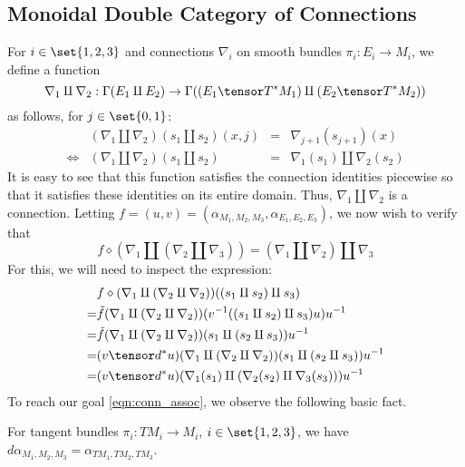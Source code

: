 \documentclass[\PRJWD/Thick_TQFTs_and_Quantum_Information.tex]{subfiles}
\begin{document}
\subsection{Monoidal Double Category of Connections}

For $i \in \set{1, 2, 3}$ and connections $\nabla_i$ on smooth bundles
$\pi_i : E_i \to M_i$, we define a function
\[
  \nabla_1 \amalg \nabla_2
    : \Gamma(E_1 \amalg E_2)
    \to \Gamma((E_1 \tensor T^*M_1) \amalg (E_2 \tensor T^*M_2))
\]
as follows, for $j \in \set{0, 1}$:
\[\begin{array}{crcl}
       & (\nabla_1 \amalg \nabla_2)(s_1 \amalg s_2)(x, j)
       & = & \nabla_{j + 1}(s_{j + 1})(x) \\
  \iff & (\nabla_1 \amalg \nabla_2)(s_1 \amalg s_2)
       & = & \nabla_1(s_1) \amalg \nabla_2(s_2)
\end{array}\]
It is easy to see that this function satisfies the connection identities
piecewise so that it satisfies these identities on its entire domain. Thus,
$\nabla_1 \amalg \nabla_2$ is a connection. Letting
$f = (u, v) = (\alpha_{M_1, M_2, M_3}, \alpha_{E_1, E_2, E_3})$, we now wish to
verify that
\begin{equation}\label{eqn:conn_assoc}
  f \diamond (\nabla_1 \amalg (\nabla_2 \amalg \nabla_3))
    = (\nabla_1 \amalg \nabla_2) \amalg \nabla_3
\end{equation}
For this, we will need to inspect the expression:
\begin{align*}
   & f \diamond (\nabla_1 \amalg (\nabla_2 \amalg \nabla_2))(
        (s_1 \amalg s_2) \amalg s_3
     ) \\
  =& \tilde{f}(\nabla_1 \amalg (\nabla_2 \amalg \nabla_2))(
      v^{-1}((s_1 \amalg s_2) \amalg s_3)u
     )u^{-1} \\
  =& \tilde{f}(\nabla_1 \amalg (\nabla_2 \amalg \nabla_2))(
      s_1 \amalg (s_2 \amalg s_3)
     )u^{-1} \\
  =& (v \tensor d^*u)(\nabla_1 \amalg (\nabla_2 \amalg \nabla_2))(
      s_1 \amalg (s_2 \amalg s_3)
     )u^{-1} \\
  =& (v \tensor d^*u)(
      \nabla_1(s_1) \amalg (\nabla_2(s_2) \amalg \nabla_3(s_3))
     )u^{-1}
\end{align*}
To reach our goal \eqref{eqn:conn_assoc}, we observe the following basic fact.
\begin{lem}
For tangent bundles $\pi_i : TM_i \to M_i$, $i \in \set{1, 2, 3}$, we have
$d\alpha_{M_1, M_2, M_3} = \alpha_{TM_1, TM_2, TM_3}$.
\end{lem}
\end{document}
